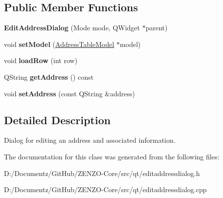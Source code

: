 \subsection*{Public Member Functions}
\begin{DoxyCompactItemize}
\item 
\mbox{\label{class_edit_address_dialog_a625792e82d332070d6009898febc3afa}} 
{\bfseries Edit\+Address\+Dialog} (Mode mode, Q\+Widget $\ast$parent)
\item 
\mbox{\label{class_edit_address_dialog_a57d26af2c34bd45c06596e9b3fc9a446}} 
void {\bfseries set\+Model} (\mbox{\hyperlink{class_address_table_model}{Address\+Table\+Model}} $\ast$model)
\item 
\mbox{\label{class_edit_address_dialog_a45d90d6f757fb4b20788710c8533036b}} 
void {\bfseries load\+Row} (int row)
\item 
\mbox{\label{class_edit_address_dialog_afe0ba363f55641dc7e510fff7764a5f1}} 
Q\+String {\bfseries get\+Address} () const
\item 
\mbox{\label{class_edit_address_dialog_afcaca5a8e493b9493d2ca2430f7ac5eb}} 
void {\bfseries set\+Address} (const Q\+String \&address)
\end{DoxyCompactItemize}


\subsection{Detailed Description}
Dialog for editing an address and associated information. 

The documentation for this class was generated from the following files\+:\begin{DoxyCompactItemize}
\item 
D\+:/\+Documentz/\+Git\+Hub/\+Z\+E\+N\+Z\+O-\/\+Core/src/qt/editaddressdialog.\+h\item 
D\+:/\+Documentz/\+Git\+Hub/\+Z\+E\+N\+Z\+O-\/\+Core/src/qt/editaddressdialog.\+cpp\end{DoxyCompactItemize}

